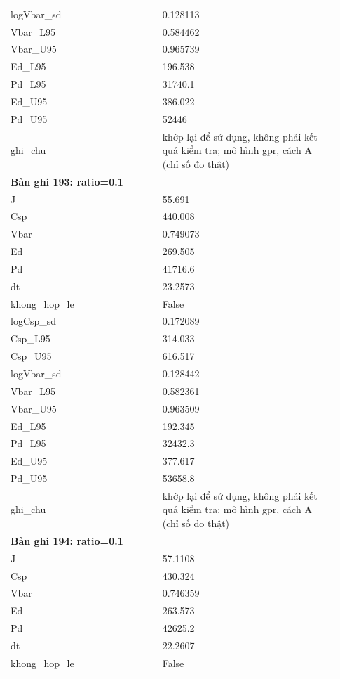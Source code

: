 \begin{longtable}{p{0.43\linewidth}p{0.50\linewidth}}
logVbar\_\allowbreak sd & 0.128113 \\
Vbar\_\allowbreak L95 & 0.584462 \\
Vbar\_\allowbreak U95 & 0.965739 \\
Ed\_\allowbreak L95 & 196.538 \\
Pd\_\allowbreak L95 & 31740.1 \\
Ed\_\allowbreak U95 & 386.022 \\
Pd\_\allowbreak U95 & 52446 \\
ghi\_\allowbreak chu & khớp lại để sử dụng, không phải kết quả kiểm tra; mô hình gpr, cách A (chỉ số đo thật) \\
\midrule
\multicolumn{2}{p{0.95\linewidth}}{\textbf{Bản ghi 193: ratio=0.1}} \\
J & 55.691 \\
Csp & 440.008 \\
Vbar & 0.749073 \\
Ed & 269.505 \\
Pd & 41716.6 \\
dt & 23.2573 \\
khong\_\allowbreak hop\_\allowbreak le & False \\
logCsp\_\allowbreak sd & 0.172089 \\
Csp\_\allowbreak L95 & 314.033 \\
Csp\_\allowbreak U95 & 616.517 \\
logVbar\_\allowbreak sd & 0.128442 \\
Vbar\_\allowbreak L95 & 0.582361 \\
Vbar\_\allowbreak U95 & 0.963509 \\
Ed\_\allowbreak L95 & 192.345 \\
Pd\_\allowbreak L95 & 32432.3 \\
Ed\_\allowbreak U95 & 377.617 \\
Pd\_\allowbreak U95 & 53658.8 \\
ghi\_\allowbreak chu & khớp lại để sử dụng, không phải kết quả kiểm tra; mô hình gpr, cách A (chỉ số đo thật) \\
\midrule
\multicolumn{2}{p{0.95\linewidth}}{\textbf{Bản ghi 194: ratio=0.1}} \\
J & 57.1108 \\
Csp & 430.324 \\
Vbar & 0.746359 \\
Ed & 263.573 \\
Pd & 42625.2 \\
dt & 22.2607 \\
khong\_\allowbreak hop\_\allowbreak le & False \\

\end{longtable}
